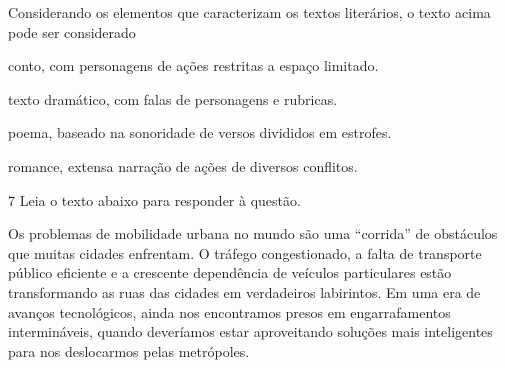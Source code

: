 Considerando os elementos que caracterizam os textos literários, o texto
acima pode ser considerado

\begin{escolha}

    \item conto, com personagens de ações restritas a espaço limitado.
    
    \item texto dramático, com falas de personagens e rubricas.  
    
    \item poema, baseado na sonoridade de versos divididos em estrofes.  
    
    \item romance, extensa narração de ações de diversos conflitos. 

\end{escolha}

\num{7} Leia o texto abaixo para responder à questão. 

\begin{myquote}





Os problemas de mobilidade urbana no mundo são uma ``corrida'' de obstáculos que
muitas cidades enfrentam. O tráfego congestionado, a falta de
transporte público eficiente e a crescente dependência de veículos
particulares estão transformando as ruas das cidades em verdadeiros
labirintos. Em uma era de avanços tecnológicos, ainda nos encontramos presos
em engarrafamentos intermináveis, quando deveríamos estar aproveitando
soluções mais inteligentes para nos deslocarmos pelas metrópoles.



\end{myquote}

